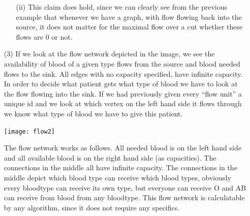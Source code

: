 \documentclass{article}
\begin{document}
\begin{itemize}
\begin{itemize}
\item[(ii)] This claim does hold, since we can clearly see from the previous example that whenever we have a graph, with flow flowing back into the source, it does not matter for the maximal flow over a cut whether these flows are $0$ or not.

\end{itemize}

\item[(3)] If we look at the flow network depicted in the image, we see the availability of blood of a given type flows from the source and blood needed flows to the sink. All edges with no capacity specified, have infinite capacity. In order to decide what patient gets what type of blood we have to look at the flow flowing into the sink. If we had previously given every ``flow unit'' a unique id and we look at which vertex on the left hand side it flows through we know what type of blood we have to give this patient.
\begin{center}\texttt{[image: flow2]}\end{center}

The flow network works as follows. All needed blood is on the left hand side and all available blood is on the right hand side (as capacities). The connections in the middle all have infinite capacity. The connections in the middle depict which blood type can receive which blood types, obviously every bloodtype can receive its own type, but everyone can receive O and AB can receive from blood from any bloodtype. This flow network is calculatable by any algorithm, since it does not require any specifics.

\end{itemize}
\end{document}
